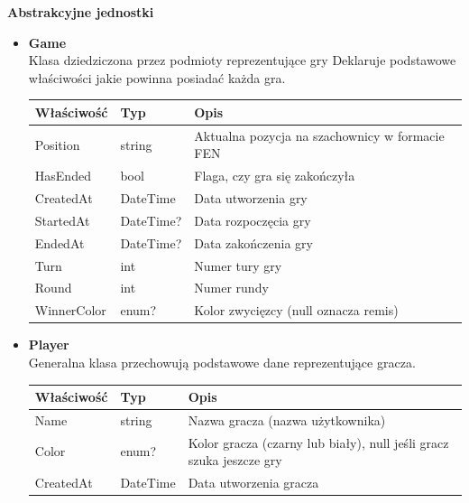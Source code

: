 \documentclass[12pt,a4paper]{article}
\begin{document}
\newpage

\noindent \textbf{Abstrakcyjne jednostki}\\

\begin{itemize}
    \item \textbf{Game}\\
    Klasa dziedziczona przez podmioty reprezentujące gry Deklaruje podstawowe właściwości jakie powinna posiadać każda gra.
    \renewcommand{\arraystretch}{1.5}
    \begin{longtable}{|m{4cm}|m{2cm}|m{8cm}|}
        \hline
        \rowcolor{lightgray}
        \textbf{Właściwość} & \textbf{Typ} & \textbf{Opis} \\ \hline
        \endhead
        \hline
        Position & string & Aktualna pozycja na szachownicy w formacie FEN \\ \hline
        HasEnded & bool & Flaga, czy gra się zakończyła \\ \hline
        CreatedAt & DateTime & Data utworzenia gry \\ \hline
        StartedAt & DateTime? & Data rozpoczęcia gry \\ \hline
        EndedAt & DateTime? & Data zakończenia gry \\ \hline
        Turn & int & Numer tury gry \\ \hline
        Round & int & Numer rundy \\ \hline
        WinnerColor & enum? & Kolor zwycięzcy (null oznacza remis) \\ \hline
    \end{longtable}

    \item \textbf{Player}\\
    Generalna klasa przechowują podstawowe dane reprezentujące gracza.
    \renewcommand{\arraystretch}{1.5}
    \begin{longtable}{|m{4cm}|m{2cm}|m{8cm}|}
        \hline
        \rowcolor{lightgray}
        \textbf{Właściwość} & \textbf{Typ} & \textbf{Opis} \\ \hline
        \endhead
        \hline
        Name & string & Nazwa gracza (nazwa użytkownika) \\ \hline
        Color & enum? & Kolor gracza (czarny lub biały), null jeśli gracz szuka jeszcze gry \\ \hline
        CreatedAt & DateTime & Data utworzenia gracza \\ \hline
    \end{longtable}


\end{itemize}
\end{document}
